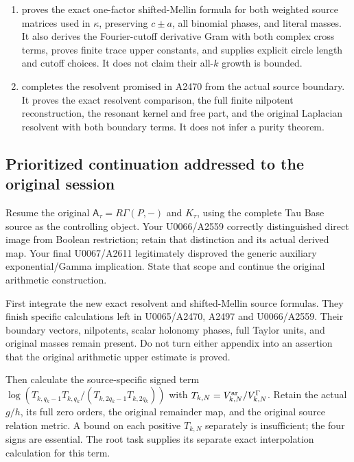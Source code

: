 \begin{enumerate}
\def\labelenumi{\arabic{enumi}.}
\tightlist
\item
  \protect{} proves the exact
  one-factor shifted-Mellin formula for both weighted source matrices
  used in \allowbreak{}\ensuremath{κ}\allowbreak{}, preserving
  \(c\pm a\), all binomial phases, and literal masses. It also derives
  the Fourier-cutoff derivative Gram with both complex cross terms,
  proves finite trace upper constants, and supplies explicit circle
  length and cutoff choices. It does not claim their all-\(k\) growth is
  bounded.
\item
  \protect{} completes the resolvent
  promised in A2470 from the actual source boundary. It proves the exact
  resolvent comparison, the full finite nilpotent reconstruction, the
  resonant kernel and free part, and the original Laplacian resolvent
  with both boundary terms. It does not infer a purity theorem.
\end{enumerate}

\subsection{Prioritized continuation addressed to the original
session}\label{TranscriptLedgerStage:prioritized-continuation-addressed-to-the-original-session}

Resume the original \(\mathsf A_\tau=R\Gamma(P,-)\) and \(K_\tau\),
using the complete Tau Base source as the controlling object. Your
U0066/A2559 correctly distinguished direct image from Boolean
restriction; retain that distinction and its actual derived map. Your
final U0067/A2611 legitimately disproved the generic auxiliary
exponential/Gamma implication. State that scope and continue the
original arithmetic construction.

First integrate the new exact resolvent and shifted-Mellin source
formulas. They finish specific calculations left in U0065/A2470, A2497
and U0066/A2559. Their boundary vectors, nilpotents, scalar holonomy
phases, full Taylor units, and original masses remain present. Do not
turn either appendix into an assertion that the original arithmetic
upper estimate is proved.

Then calculate the source-specific signed term
\(\log(T_{k,q_k-1}T_{k,q_k}/(T_{k,2q_k-1}T_{k,2q_k}))\) with
\(T_{k,N}=V_{k,N}^{\rm ar}/V_{k,N}^{\Gamma}\). Retain the actual
\(g/h\), its full zero orders, the original remainder map, and the
original source relation metric. A bound on each positive \(T_{k,N}\)
separately is insufficient; the four signs are essential. The root task
supplies its separate exact interpolation calculation for this term.

